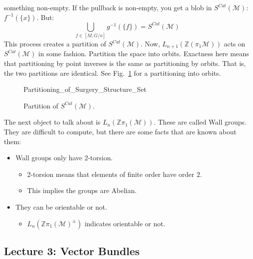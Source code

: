\documentclass[crop=false,class=book,oneside]{standalone}                      %
\begin{document}
            something non-empty. If the pullback is non-empty, you get a blob
            in $S^{Cat}(\mathcal{M})$: $f^{-1}(\{x\})$. But:
            \begin{equation}
                \bigcup_{f\in[M,G/o]}g^{-1}(\{f\})=S^{Cat}(\mathcal{M})
            \end{equation}
            This process creates a partition of $S^{Cat}(\mathcal{M})$. Now,
            $L_{n+1}(\mathbb{Z}(\pi_{1}\mathcal{M}))$ acts on
            $S^{Cat}(\mathcal{M})$ in some fashion. Partition the space into
            orbits. Exactness here means that partitioning by point inverses
            is the same as partitioning by orbits. That is, the two partitions
            are identical. See Fig.~\ref{fig:surgery_theory_partition_of_S_Cat}
            for a partitioning into orbits.
            \newpage
            \begin{figure}[H]
                \centering
                \captionsetup{type=figure}
                
                          {Partitioning_of_Surgery_Structure_Set}
                \caption{Partition of $S^{Cat}(\mathcal{M})$.}
                \label{fig:surgery_theory_partition_of_S_Cat}
            \end{figure}
            The next object to talk about is
            $L_{n}(\mathbb{Z}\pi_{1}(\mathcal{M}))$.
            These are called Wall groups. They are difficult to compute,
            but there are some facts that are known about them:
            \begin{itemize}
                \item Wall groups only have 2-torsion.
                \begin{itemize}
                    \item 2-torsion means that elements
                          of finite order have order $2$.
                    \item This implies the groups are Abelian.
                \end{itemize}
                \item They can be orientable or not.
                \begin{itemize}
                    \item $L_{n}(\mathbb{Z}\pi_{1}(\mathcal{M})^{\pm})$
                           indicates orientable or not.
                \end{itemize}
            \end{itemize}
    \subsection{Lecture 3: Vector Bundles}
\end{document}
